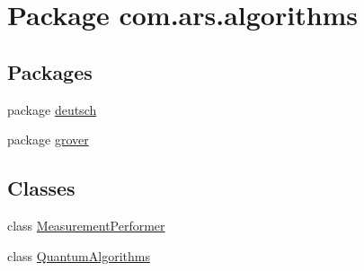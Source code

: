 \hypertarget{namespacecom_1_1ars_1_1algorithms}{}\section{Package com.\+ars.\+algorithms}
\label{namespacecom_1_1ars_1_1algorithms}
\subsection*{Packages}
\begin{DoxyCompactItemize}
\item 
package \hyperlink{namespacecom_1_1ars_1_1algorithms_1_1deutsch}{deutsch}
\item 
package \hyperlink{namespacecom_1_1ars_1_1algorithms_1_1grover}{grover}
\end{DoxyCompactItemize}
\subsection*{Classes}
\begin{DoxyCompactItemize}
\item 
class \hyperlink{classcom_1_1ars_1_1algorithms_1_1_measurement_performer}{Measurement\+Performer}
\item 
class \hyperlink{classcom_1_1ars_1_1algorithms_1_1_quantum_algorithms}{Quantum\+Algorithms}
\end{DoxyCompactItemize}
